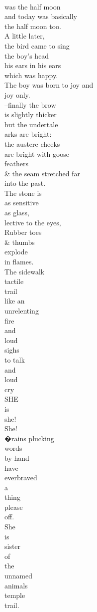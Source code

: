 \documentclass[smalldemyvopaper,11pt,twoside,onecolumn,openright,extrafontsizes]{memoir}
\begin{document}
\\was the half moon
\\and today was basically
\\the half moon too.
\\A little later,
\\the bird came to sing
\\the boy's head
\\his ears in his ears
\\which was happy.
\\The boy was born to joy and
\\joy only.
\\--finally the brow
\\is slightly thicker
\\but the undertale
\\arks are bright:
\\the austere cheeks
\\are bright with goose
\\feathers
\\\& the seam stretched far
\\into the past.
\\The stone is
\\as sensitive
\\as glass,
\\lective to the eyes,
\\Rubber toes
\\\& thumbs
\\explode
\\in flames.
\\The sidewalk
\\tactile
\\trail
\\like an
\\unrelenting
\\fire
\\and
\\loud
\\sighs
\\to talk
\\and
\\loud
\\cry
\\SHE
\\is
\\she!
\\She!
\\�rains plucking
\\words
\\by hand
\\have
\\everbraved
\\a
\\thing
\\please
\\off.
\\She
\\is
\\sister
\\of
\\the
\\unnamed
\\animals
\\temple
\\trail.
\end{document}

